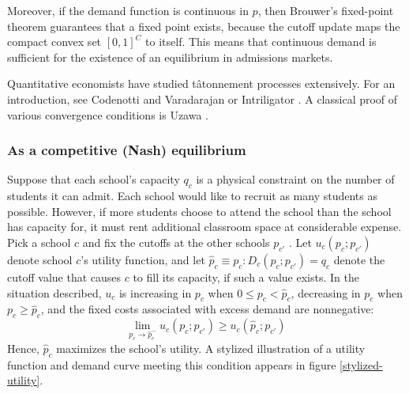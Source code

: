 \documentclass[12pt]{article}
\numberwithin{equation}{subsection}
\theoremstyle{definition}
\begin{document}
Moreover, if the demand function is continuous in $p$, then Brouwer's fixed-point theorem guarantees that a fixed point exists, because the cutoff update maps the compact convex set $[0, 1]^C$ to itself. This means that continuous demand is sufficient for the existence of an equilibrium in admissions markets. 

Quantitative economists have studied t\^{a}tonnement processes extensively. For an introduction, see Codenotti and Varadarajan \parencite*{compmkteq} or Intriligator \parencite*[][chap. 9]{mathematicaloptandecontheory}. A classical proof of various convergence conditions is Uzawa \parencite*{walrastatonnement}. 

\subsubsection{As a competitive (Nash) equilibrium} \label{asacompeq}
Suppose that each school's capacity $q_c$ is a physical constraint on the number of students it can admit. Each school would like to recruit as many students as possible. However, if more students choose to attend the school than the school has capacity for, it must rent additional classroom space at considerable expense. Pick a school $c$ and fix the cutoffs at the other schools $p_{c'}$ . Let $u_c(p_c; p_{c'})$ denote school $c$'s utility function, and let $\hat p_c \equiv p_c: D_c(p_c; p_{c'}) = q_c$ denote the cutoff value that causes $c$ to fill its capacity, if such a value exists. In the situation described, $u_c$ is increasing in $p_c$ when $0 \leq p_c < \hat p_c$, decreasing in $p_c$ when $p_c \geq \hat p_c$, and the fixed costs associated with excess demand are nonnegative: \[\lim_{p_c \to \hat p_c^-} u_c(p_c; p_{c'}) \geq u_c(\hat p_c; p_{c'})\]
Hence, $\hat p_c$ maximizes the school's utility. A stylized illustration of a utility function and demand curve meeting this condition appears in figure \ref{stylized-utility}. 
\end{document}
